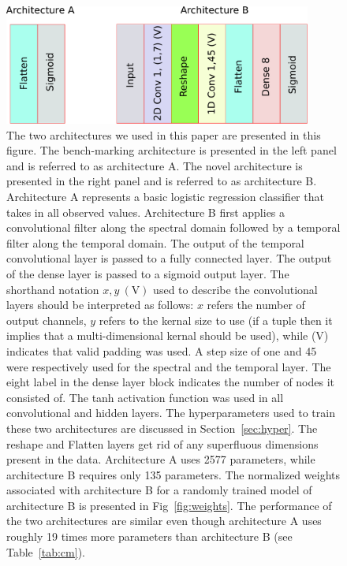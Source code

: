 \documentclass{article}
\begin{document}

\begin{figure}
\includegraphics[width=0.9\textwidth]{Architectures.pdf} 
\caption{The two architectures we used in this paper are presented in this figure. The bench-marking architecture is presented in the left panel and is referred to as architecture A. The novel architecture is presented in the right panel and is referred to as architecture B. Architecture A represents a basic logistic regression classifier that takes in all observed values. Architecture B first applies a convolutional filter along the spectral domain followed by a temporal filter along the temporal domain. The output of the temporal convolutional layer is passed to a fully connected layer. The output of the dense layer is passed to a sigmoid output layer. The shorthand notation $x, y~(\textrm{V})$ used to describe the convolutional layers should be interpreted as follows: $x$ refers the number of output channels, $y$ refers to the kernal size to use (if a tuple then it implies that a multi-dimensional kernal should be used), while (V) indicates that valid padding was used. A step size of one and 45 were respectively used for the spectral and the temporal layer. The eight label in the dense layer block indicates the number of nodes it consisted of. The tanh activation function was used in all convolutional and hidden layers. The hyperparameters used to train these two architectures are discussed in Section~\ref{sec:hyper}. The reshape and Flatten layers get rid of any superfluous dimensions present in the data. Architecture A uses 2577 parameters, while architecture B requires only 135 parameters. The normalized weights associated with architecture B for a randomly trained model of architecture B is presented in Fig~\ref{fig:weights}. The performance of the two architectures are similar even though architecture A uses roughly 19 times more parameters than architecture B (see Table~\ref{tab:cm}).}
\label{fig:ach}

\end{figure}
\end{document}
